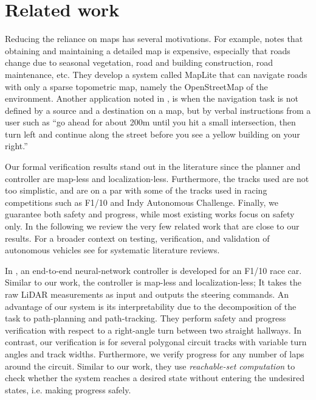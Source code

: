\section{Related work}
\label{sec:relwork}
Reducing the reliance on maps has several motivations.
%
For example, \cite{Ort.2019} notes that 
obtaining and maintaining a detailed map is expensive, especially that roads change due to seasonal vegetation, road and building construction, road maintenance, etc.
%
They develop a system called MapLite that can navigate roads with only a sparse topometric map, namely the OpenStreetMap of the environment.
%
Another application noted in \cite{Vasudevan.2021}, \cite{Deruyttere.2019} is when the navigation task is not defined by a source and a destination on a map, but by verbal instructions from a user such as ``go ahead for about 200m until you hit a small intersection, then turn left and continue along the street before you see a yellow building on your right.''


Our formal verification results stand out in the literature since the planner and controller are map-less and localization-less.
%
Furthermore, the tracks used are not too simplistic, and are on a par with some of the tracks used in racing competitions such as F1/10 and Indy Autonomous Challenge.
%
Finally, we guarantee both safety and progress, while most existing works focus on safety only.
%
In the following we review the very few related work that are close to our results.
%
For a broader context on testing, verification, and validation of autonomous vehicles see \cite{Rajabli.2020, Zhang.2020} for systematic literature reviews.


In \cite{Ivanov.2020, Ivanov-verifying.2020}, an end-to-end neural-network controller is developed for an F1/10 race car.
%
Similar to our work, the controller is map-less and localization-less;
%
It takes the raw LiDAR measurements as input and outputs the steering commands.
%
An advantage of our system is its interpretability due to the decomposition of the task to path-planning and path-tracking.
%
They perform safety and progress verification with respect to a right-angle turn between two straight hallways.
%
In contrast, our verification is for several polygonal circuit tracks with variable turn angles and track widths.
%
Furthermore, we verify progress for any number of laps around the circuit.
%
Similar to our work, they use \emph{reachable-set computation} to check whether the system reaches a desired state without entering the undesired states, i.e. making progress safely.



